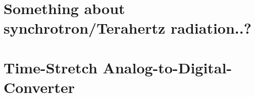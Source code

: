 \section{Something about synchrotron/Terahertz radiation..?}
\section{Time-Stretch Analog-to-Digital-Converter}